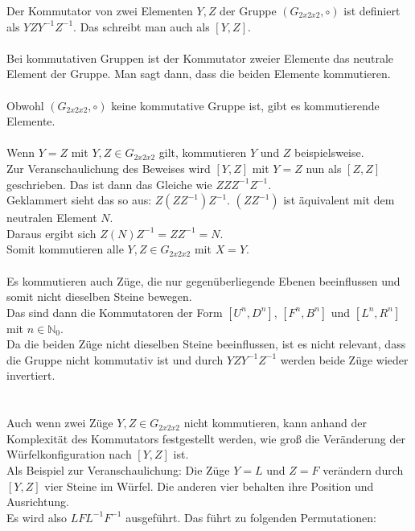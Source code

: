 \documentclass[12pt,a4paper, usenames, dvipsnames]{article}
\begin{document}
Der Kommutator von zwei Elementen $Y, Z$ der Gruppe $(G_{2x2x2}, \circ)$ ist definiert als $YZY^{-1}Z^{-1}$. Das schreibt man auch als $[Y,Z]$. \\
\\
Bei kommutativen Gruppen ist der Kommutator zweier Elemente das neutrale Element der Gruppe. \cite{TD} Man sagt dann, dass die beiden Elemente kommutieren. \\
\\
Obwohl $(G_{2x2x2}, \circ)$ keine kommutative Gruppe ist, gibt es kommutierende Elemente. \\
\\
Wenn $Y = Z$ mit $Y, Z \in G_{2x2x2}$ gilt, kommutieren $Y$ und $Z$ beispielsweise. \\
Zur Veranschaulichung des Beweises wird $[Y,Z]$ mit $Y=Z$ nun als $[Z,Z]$ geschrieben. Das ist dann das Gleiche wie $ZZZ^{-1}Z^{-1}$. \\ 
Geklammert sieht das so aus: $Z(ZZ^{-1})Z^{-1}$. $(ZZ^{-1})$ ist äquivalent mit dem neutralen Element $N$. \\
Daraus ergibt sich $Z(N)Z^{-1} = ZZ^{-1} = N$. \\
Somit kommutieren alle $Y, Z \in G_{2x2x2}$ mit $X=Y$.
\\
\\
Es kommutieren auch Züge, die nur gegenüberliegende Ebenen beeinflussen und somit nicht dieselben Steine bewegen. \\
Das sind dann die Kommutatoren der Form $[U^n, D^n]$, $[F^n, B^n]$ und $[L^n, R^n]$ mit $n \in \mathbb{N}_0$. \\
Da die beiden Züge nicht dieselben Steine beeinflussen, ist es nicht relevant, dass die Gruppe nicht kommutativ ist und durch $YZY^{-1}Z^{-1}$ werden beide Züge wieder invertiert. \\
\\
\\
Auch wenn zwei Züge $Y, Z \in G_{2x2x2}$ nicht kommutieren, kann anhand der Komplexität des Kommutators festgestellt werden, wie groß die Veränderung der Würfelkonfiguration nach $[Y, Z]$ ist. \\
Als Beispiel zur Veranschaulichung: Die Züge $Y=L$ und $Z=F$ verändern durch $[Y, Z]$ vier Steine im Würfel. Die anderen vier behalten ihre Position und Ausrichtung. \\
Es wird also $LFL^{-1}F^{-1}$ ausgeführt. Das führt zu folgenden Permutationen:
\end{document}
